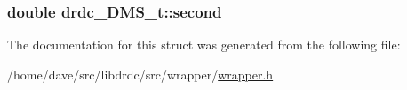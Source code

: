 \hypertarget{structdrdc__DMS__t_b7d6a7b2cb350650467f89e7a60a29dc}{
\subsubsection[second]{\setlength{\rightskip}{0pt plus 5cm}double {\bf drdc\_\-DMS\_\-t::second}}}
\label{structdrdc__DMS__t_b7d6a7b2cb350650467f89e7a60a29dc}




The documentation for this struct was generated from the following file:\begin{CompactItemize}
\item 
/home/dave/src/libdrdc/src/wrapper/\hyperlink{wrapper_8h}{wrapper.h}\end{CompactItemize}

